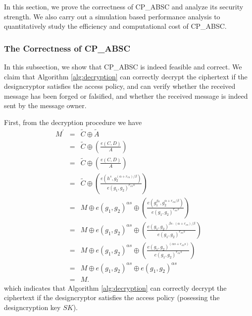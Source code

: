 \documentclass[letterpaper,12pt]{article}
\begin{document}
In this section, we prove the correctness of CP\_ABSC and analyze its security strength. We also carry out a simulation based performance analysis to quantitatively study the efficiency and computational cost of CP\_ABSC.

\subsubsection{The Correctness of CP\_ABSC}
In this subsection, we show that CP\_ABSC is indeed feasible and correct. We claim that
Algorithm \ref {alg:decryption} can correctly decrypt the ciphertext if the designcryptor satisfies the access policy, and can verify whether the received message has been forged or falsified, and whether the received message is indeed sent by the message owner.

First, from the decryption procedure we have
\begin{eqnarray*}
 M^\prime&= &\tilde{C}\oplus \tilde{A}\\
 & = & \tilde{C}\oplus(\frac{e(C,D)}{A}) \\
  &=&\tilde{C}\oplus(\frac{e(C,D)}{A})\\
 & = & \tilde{C}\oplus(\frac{e(h^s, g_2^{(\alpha+r_{en})/\beta})}{e(g_1,g_2)^{r_{en}s}})\\
 &=& M\oplus e(g_1,g_2)^{\alpha s}\oplus(\frac{e(g_1^{\beta s},g_2^{\alpha+r_{en}/\beta})}{e(g_1,g_2)^{r_{en}s}})\\
 &=& M\oplus e(g_1,g_2)^{\alpha s}\oplus(\frac{e(g_1,g_2)^{\beta s \cdot (\alpha+r_{en})/\beta}}{e(g_1,g_2)^{r_{en}s}})\\
 &=& M\oplus e(g_1,g_2)^{\alpha s}\oplus(\frac{e(g_1,g_2)^{(\alpha s+r_{en}s)}}{e(g_1,g_2)^{r_{en}s}})\\
 &=& M\oplus e(g_1,g_2)^{\alpha s}\oplus e(g_1,g_2)^{\alpha s} \\
 &=& M.
\end{eqnarray*}
which indicates that Algorithm \ref{alg:decryption} can correctly decrypt the ciphertext if the designcryptor satisfies the access policy (posessing the designcryption key $SK$).
\end{document}
